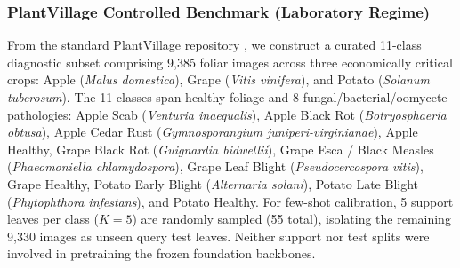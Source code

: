 \documentclass[preprint,12pt]{elsarticle}
\begin{document}
\subsubsection{PlantVillage Controlled Benchmark (Laboratory Regime)}
From the standard PlantVillage repository \cite{hughes2012plantvillage}, we construct a curated 11-class diagnostic subset comprising 9,385 foliar images across three economically critical crops: Apple (\textit{Malus domestica}), Grape (\textit{Vitis vinifera}), and Potato (\textit{Solanum tuberosum}). The 11 classes span healthy foliage and 8 fungal/bacterial/oomycete pathologies: Apple Scab (\textit{Venturia inaequalis}), Apple Black Rot (\textit{Botryosphaeria obtusa}), Apple Cedar Rust (\textit{Gymnosporangium juniperi-virginianae}), Apple Healthy, Grape Black Rot (\textit{Guignardia bidwellii}), Grape Esca / Black Measles (\textit{Phaeomoniella chlamydospora}), Grape Leaf Blight (\textit{Pseudocercospora vitis}), Grape Healthy, Potato Early Blight (\textit{Alternaria solani}), Potato Late Blight (\textit{Phytophthora infestans}), and Potato Healthy. For few-shot calibration, 5 support leaves per class ($K=5$) are randomly sampled (55 total), isolating the remaining 9,330 images as unseen query test leaves. Neither support nor test splits were involved in pretraining the frozen foundation backbones.
\end{document}
